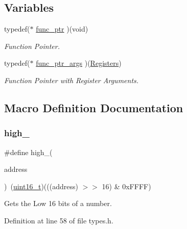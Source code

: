 \subsection*{Variables}
\begin{DoxyCompactItemize}
\item 
typedef($\ast$ \hyperlink{a00125_a5e730b1100d491afc6fa17d12fcd15a8_a5e730b1100d491afc6fa17d12fcd15a8}{func\+\_\+ptr} )(void)
\begin{DoxyCompactList}\small\item\em Function Pointer. \end{DoxyCompactList}\item 
typedef($\ast$ \hyperlink{a00125_a7ec4af7c086c1f2c2a0e01fc23203a56_a7ec4af7c086c1f2c2a0e01fc23203a56}{func\+\_\+ptr\+\_\+args} )(\hyperlink{a00234}{Registers})
\begin{DoxyCompactList}\small\item\em Function Pointer with Register Arguments. \end{DoxyCompactList}\end{DoxyCompactItemize}


\subsection{Macro Definition Documentation}
\mbox{\label{a00125_a0a63db19c3e2153ed419aeccf4e33c92_a0a63db19c3e2153ed419aeccf4e33c92}} 
\subsubsection{\texorpdfstring{high\+\_}{high\_16}}
{\footnotesize\ttfamily \#define high\+\_(\begin{DoxyParamCaption}\item[{}]{address }\end{DoxyParamCaption})~(\hyperlink{a00125_a273cf69d639a59973b6019625df33e30_a273cf69d639a59973b6019625df33e30}{uint16\+\_\+t})(((address) $>$$>$ 16) \& 0x\+F\+F\+F\+F)}



Gets the Low 16 bits of a number. 



Definition at line 58 of file types.\+h.

\mbox{\label{a00125_aded7ad58a4bedfffea10d5ae9c0c817e_aded7ad58a4bedfffea10d5ae9c0c817e}} 
